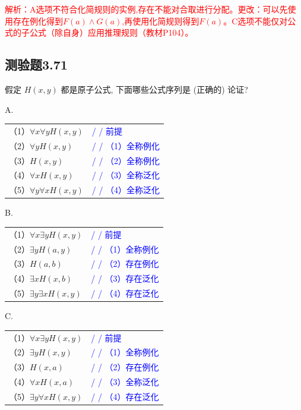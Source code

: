 \documentclass[UTF8, heading=true]{ctexart}
\begin{document}
\textcolor{red}{解析：A选项不符合化简规则的实例,存在不能对合取进行分配。更改：可以先使用存在例化得到$F(a)\wedge G(a)$,再使用化简规则得到$F(a)$。C选项不能仅对公式的子公式（除自身）应用推理规则（教材P104）。}

\subsection{测验题3.71}

假定 $H(x, y)$ 都是原子公式, 下面哪些公式序列是 (正确的) 论证?

A. 

\begin{tabular}{ll}
  （1）$\forall x \forall y H(x, y)$ & \textcolor{blue}{/ / 前提} \\
  （2）$\forall y H(x, y)$ & \textcolor{blue}{/ / （1）全称例化} \\
  （3）$H(x, y)$ & \textcolor{blue}{/ / （2）全称例化} \\
  （4）$\forall x H(x, y)$ & \textcolor{blue}{/ / （3）全称泛化} \\
  （5）$\forall y \forall x H(x, y)$ & \textcolor{blue}{/ / （4）全称泛化}
\end{tabular}

B. 

\begin{tabular}{ll}
  （1）$\forall x \exists y H(x, y)$ & \textcolor{blue}{/ / 前提} \\
  （2）$\exists y H(a, y)$ & \textcolor{blue}{/ / （1）全称例化} \\
  （3）$H(a, b)$ & \textcolor{blue}{/ / （2）存在例化} \\
  （4）$\exists x H(x, b)$ & \textcolor{blue}{/ / （3）存在泛化} \\
  （5）$\exists y \exists x H(x, y)$ & \textcolor{blue}{/ / （4）存在泛化}
\end{tabular}


C. 

\begin{tabular}{ll}
  （1）$\forall x \exists y H(x, y)$ & \textcolor{blue}{/ / 前提} \\
  （2）$\exists y H(x, y)$ & \textcolor{blue}{/ / （1）全称例化} \\
  （3）$H(x, a)$ & \textcolor{blue}{/ / （2）存在例化} \\
  （4）$\forall x H(x, a)$ & \textcolor{blue}{/ / （3）全称泛化} \\
  （5）$\exists y \forall x H(x, y)$ & \textcolor{blue}{/ / （4）存在泛化}
\end{tabular}
\end{document}
